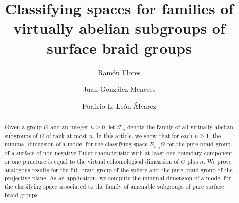\documentclass[a4paper,12pt,leqno]{amsart}
\theoremstyle{definition}
\begin{document}
\title[]{Classifying spaces for families of virtually abelian subgroups of surface braid groups}







\author[Ramón Flores]{Ramón Flores}
\address{Dpto. Geometría y Topología, Facultad de Matemáticas, Instituto de Matemáticas (IMUS), Universidad de Sevilla, Av. Reina Mercedes s/n, 41012 Sevilla, Spain}

\author[Juan González-Meneses]{Juan González-Meneses}
\address{Dpto. Álgebra, Facultad de Matemáticas, Instituto de Matemáticas (IMUS), Universidad de Sevilla, Av. Reina Mercedes s/n, 41012 Sevilla, Spain}

\author[Porfirio L. León Álvarez]{Porfirio L. León Álvarez}
\address{Instituto de Matemáticas, Universidad Nacional Autónoma de México, Oaxaca de Juárez, Oaxaca, México 68000}





\date{}





\begin{abstract}

Given a group $G$ and an integer $n \geq 0$, let $\mathcal{F}_n$ denote the family of all virtually abelian subgroups of $G$ of rank at most $n$.
In this article, we show that for each $n \geq 1$, the minimal dimension of a model for the classifying space $E_{\mathcal{F}_n}G$ for the pure braid group of a surface of non-negative Euler characteristic with at least one boundary component or one puncture is equal to the virtual cohomological dimension of $G$ plus $n$. We prove analogous results for the full braid group of the sphere and the pure braid group of the projective plane.
As an application, we compute the minimal dimension of a model for the classifying space associated to the family of amenable subgroups of pure surface braid groups.
\end{abstract}
\maketitle
\end{document}
